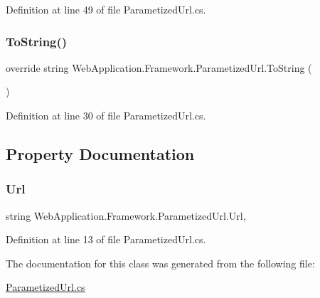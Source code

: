 Definition at line 49 of file Parametized\+Url.\+cs.

\mbox{\label{classWebApplication_1_1Framework_1_1ParametizedUrl_a683634894d4a0b4afea0ce3054d5e035}} 
\subsubsection{\texorpdfstring{ToString()}{ToString()}}
{\footnotesize\ttfamily override string Web\+Application.\+Framework.\+Parametized\+Url.\+To\+String (\begin{DoxyParamCaption}{ }\end{DoxyParamCaption})}



Definition at line 30 of file Parametized\+Url.\+cs.



\subsection{Property Documentation}
\mbox{\label{classWebApplication_1_1Framework_1_1ParametizedUrl_a34be3576c697a64fb6dcc2cc00cb799c}} 
\subsubsection{\texorpdfstring{Url}{Url}}
{\footnotesize\ttfamily string Web\+Application.\+Framework.\+Parametized\+Url.\+Url\hspace{0.3cm}{\ttfamily [get]}, {\ttfamily [set]}}



Definition at line 13 of file Parametized\+Url.\+cs.



The documentation for this class was generated from the following file\+:\begin{DoxyCompactItemize}
\item 
\mbox{\hyperlink{ParametizedUrl_8cs}{Parametized\+Url.\+cs}}\end{DoxyCompactItemize}
